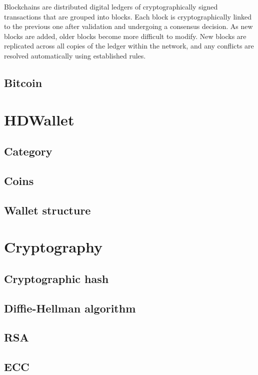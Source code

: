 Blockchains are distributed digital ledgers of cryptographically signed transactions that are grouped into blocks. 
Each block is cryptographically linked to the previous one after validation and undergoing a consensus decision. 
As new blocks are added, older blocks become more difficult to modify. New blocks are replicated across all copies of the ledger within the network, and any conflicts are resolved automatically using established rules. 


\subsection{Bitcoin}



\section{HDWallet}

\subsection{Category}

\subsection{Coins}

\subsection{Wallet structure}

\section{Cryptography}

\subsection{Cryptographic hash}

\subsection{Diffie-Hellman algorithm}

\subsection{RSA}

\subsection{ECC}

